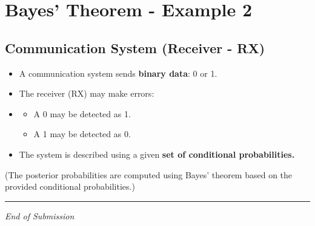 \documentclass[11pt]{article}
\begin{document}
\section{Bayes' Theorem - Example 2}
\subsection*{Communication System (Receiver - RX)}
\begin{itemize}
	\item A communication system sends \textbf{binary data}: 0 or 1.
	\item The receiver (RX) may make errors:
	\item \begin{itemize}
		\item A 0 may be detected as 1.
		\item A 1 may be detected as 0.
	\end{itemize}
	\item The system is described using a given \textbf{set of conditional probabilities.}
\end{itemize}
(The posterior probabilities are computed using Bayes' theorem based on the provided conditional probabilities.)

\vfill
\bigskip
\hrule
\vspace{0.2cm}
\begin{center}
\small \textit{End of Submission}
\end{center}
\end{document}
